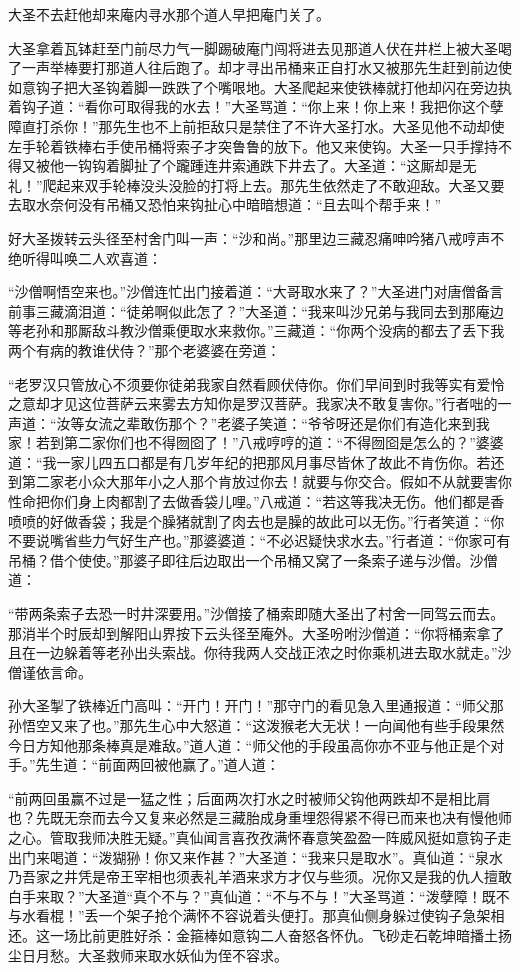 \documentclass[12pt,UTF8]{ctexbook}
\begin{document}
{大圣不去赶他却来庵内寻水那个道人早把庵门关了。

大圣拿着瓦钵赶至门前尽力气一脚踢破庵门闯将进去见那道人伏在井栏上被大圣喝了一声举棒要打那道人往后跑了。却才寻出吊桶来正自打水又被那先生赶到前边使如意钩子把大圣钩着脚一跌跌了个嘴哏地。大圣爬起来使铁棒就打他却闪在旁边执着钩子道：“看你可取得我的水去！”大圣骂道：“你上来！你上来！我把你这个孽障直打杀你！”那先生也不上前拒敌只是禁住了不许大圣打水。大圣见他不动却使左手轮着铁棒右手使吊桶将索子才突鲁鲁的放下。他又来使钩。大圣一只手撑持不得又被他一钩钩着脚扯了个躘踵连井索通跌下井去了。大圣道：“这厮却是无礼！”爬起来双手轮棒没头没脸的打将上去。那先生依然走了不敢迎敌。大圣又要去取水奈何没有吊桶又恐怕来钩扯心中暗暗想道：“且去叫个帮手来！”

好大圣拨转云头径至村舍门叫一声：“沙和尚。”那里边三藏忍痛呻吟猪八戒哼声不绝听得叫唤二人欢喜道：

“沙僧啊悟空来也。”沙僧连忙出门接着道：“大哥取水来了？”大圣进门对唐僧备言前事三藏滴泪道：“徒弟啊似此怎了？”大圣道：“我来叫沙兄弟与我同去到那庵边等老孙和那厮敌斗教沙僧乘便取水来救你。”三藏道：“你两个没病的都去了丢下我两个有病的教谁伏侍？”那个老婆婆在旁道：

“老罗汉只管放心不须要你徒弟我家自然看顾伏侍你。你们早间到时我等实有爱怜之意却才见这位菩萨云来雾去方知你是罗汉菩萨。我家决不敢复害你。”行者咄的一声道：“汝等女流之辈敢伤那个？”老婆子笑道：“爷爷呀还是你们有造化来到我家！若到第二家你们也不得囫囵了！”八戒哼哼的道：“不得囫囵是怎么的？”婆婆道：“我一家儿四五口都是有几岁年纪的把那风月事尽皆休了故此不肯伤你。若还到第二家老小众大那年小之人那个肯放过你去！就要与你交合。假如不从就要害你性命把你们身上肉都割了去做香袋儿哩。”八戒道：“若这等我决无伤。他们都是香喷喷的好做香袋；我是个臊猪就割了肉去也是臊的故此可以无伤。”行者笑道：“你不要说嘴省些力气好生产也。”那婆婆道：“不必迟疑快求水去。”行者道：“你家可有吊桶？借个使使。”那婆子即往后边取出一个吊桶又窝了一条索子递与沙僧。沙僧道：

“带两条索子去恐一时井深要用。”沙僧接了桶索即随大圣出了村舍一同驾云而去。那消半个时辰却到解阳山界按下云头径至庵外。大圣吩咐沙僧道：“你将桶索拿了且在一边躲着等老孙出头索战。你待我两人交战正浓之时你乘机进去取水就走。”沙僧谨依言命。

孙大圣掣了铁棒近门高叫：“开门！开门！”那守门的看见急入里通报道：“师父那孙悟空又来了也。”那先生心中大怒道：“这泼猴老大无状！一向闻他有些手段果然今日方知他那条棒真是难敌。”道人道：“师父他的手段虽高你亦不亚与他正是个对手。”先生道：“前面两回被他赢了。”道人道：

“前两回虽赢不过是一猛之性；后面两次打水之时被师父钩他两跌却不是相比肩也？先既无奈而去今又复来必然是三藏胎成身重埋怨得紧不得已而来也决有慢他师之心。管取我师决胜无疑。”真仙闻言喜孜孜满怀春意笑盈盈一阵威风挺如意钩子走出门来喝道：“泼猢狲！你又来作甚？”大圣道：“我来只是取水”。真仙道：“泉水乃吾家之井凭是帝王宰相也须表礼羊酒来求方才仅与些须。况你又是我的仇人擅敢白手来取？”大圣道“真个不与？”真仙道：“不与不与！”大圣骂道：“泼孽障！既不与水看棍！”丢一个架子抢个满怀不容说着头便打。那真仙侧身躲过使钩子急架相还。这一场比前更胜好杀：金箍棒如意钩二人奋怒各怀仇。飞砂走石乾坤暗播土扬尘日月愁。大圣救师来取水妖仙为侄不容求。

}
\end{document}

